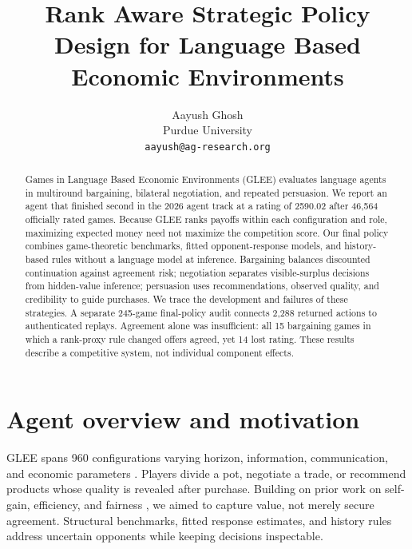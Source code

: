 \documentclass{article}
\title{Rank Aware Strategic Policy Design for Language Based Economic Environments}
\author{%
  Aayush Ghosh\\
  Purdue University\\
  \texttt{aayush@ag-research.org}
}
\begin{document}
\maketitle

\begin{abstract}
Games in Language Based Economic Environments (GLEE) evaluates language agents
in multiround bargaining, bilateral negotiation, and repeated persuasion.
We report an agent that finished second in the 2026 agent track at a rating of
2590.02 after 46,564 officially rated games. Because GLEE ranks payoffs within each
configuration and role, maximizing expected money need not maximize the
competition score. Our final policy combines game-theoretic benchmarks, fitted
opponent-response models, and history-based rules without a language model at
inference. Bargaining balances discounted continuation against agreement risk;
negotiation separates visible-surplus decisions from hidden-value inference;
persuasion uses recommendations, observed quality, and credibility to guide
purchases. We trace the development and failures of these strategies.
A separate 245-game final-policy audit connects 2,288 returned actions to
authenticated replays. Agreement alone was insufficient: all 15 bargaining
games in which a rank-proxy rule changed offers agreed, yet 14 lost rating.
These results describe a competitive system, not individual component effects.
\end{abstract}

\section{Agent overview and motivation}
\label{sec:introduction}

GLEE spans 960 configurations varying horizon, information, communication,
and economic parameters \citep{gleecompetition2026}. Players divide a pot,
negotiate a trade, or recommend products whose quality is revealed after
purchase. Building on prior work on self-gain, efficiency, and fairness
\citep{shapira2024glee}, we aimed to capture value, not merely secure agreement.
Structural benchmarks, fitted response estimates, and history rules address
uncertain opponents while keeping decisions inspectable.
\end{document}
